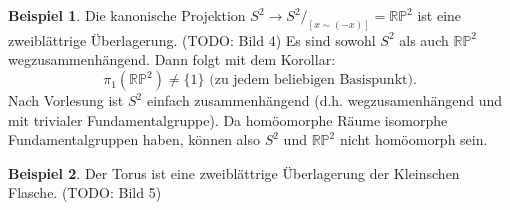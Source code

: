 \documentclass[a4paper,11pt,notitlepage]{report}
\theoremstyle{definition}
\newtheorem{example}{Beispiel}[chapter]
\newcommand{\R}{{\ensuremath{\mathbb{R}}}}
\newcommand{\Prim}{{\ensuremath{\mathbb{P}}}}
\begin{document}
\begin{example}
	Die kanonische Projektion $S^2 \rightarrow S^2/_{[x \sim (-x)]} = \R \Prim^2$ ist eine zweiblättrige Überlagerung. (TODO: Bild 4)
	\newline
	Es sind sowohl $S^2$ als auch $\R \Prim^2$ wegzusammenhängend. Dann folgt mit dem Korollar: 
	$$\pi_1(\R \Prim^2) \neq \{1\} \text{ (zu jedem beliebigen Basispunkt)}.$$
	Nach Vorlesung ist $S^2$ einfach zusammenhängend (d.h. wegzusamenhängend und mit trivialer Fundamentalgruppe). Da homöomorphe Räume isomorphe Fundamentalgruppen haben, können also $S^2$ und $\R \Prim^2$ nicht homöomorph sein.
\end{example}

\begin{example}
	Der Torus ist eine zweiblättrige Überlagerung der Kleinschen Flasche.
	(TODO: Bild 5)
\end{example}
\end{document}

